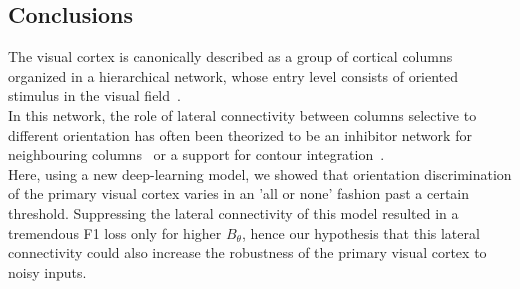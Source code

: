 \documentclass[a0,portrait]{a0poster}
\begin{document}
\begin{multicols}{3}
\section*{Conclusions}
The visual cortex is canonically described as a group of cortical columns organized in a hierarchical network, whose entry level consists of oriented stimulus in the visual field~\citep{Hubel68}. \\
In this network, the role of lateral connectivity between columns selective to different orientation has often been theorized to be an inhibitor network for neighbouring columns~\citep{BLAKEMORE1970} or a support for contour integration~\citep{Stettler2002}.\\
Here, using a new deep-learning model, we showed that orientation discrimination of the primary visual cortex varies in an 'all or none' fashion past a certain threshold. Suppressing the lateral connectivity of this model resulted in a tremendous F1 loss only for higher $B_\theta$, hence our hypothesis that this lateral connectivity could also increase the robustness of the primary visual cortex to noisy inputs. 
\color{Black} %





\end{multicols}
\end{document}
